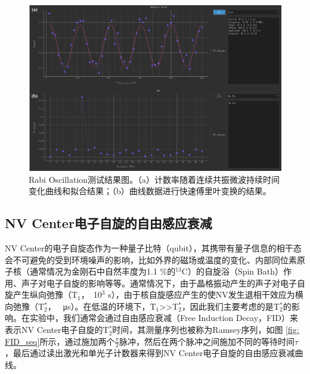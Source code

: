 \documentclass[type = bachelor, oneside]{whu-thesis}
\begin{document}
\begin{figure}
  \centering
  \includegraphics[width=1.0\textwidth]{figures/Chapter 2/Rabi Result.png}
  \caption[Rabi Oscillation测试结果图]{Rabi Oscillation测试结果图。（a）计数率随着连续共振微波持续时间变化曲线和拟合结果；（b）曲线数据进行快速傅里叶变换的结果。}
  \label{fig: Rabi Result}
\end{figure}

\subsection{NV Center电子自旋的自由感应衰减}

NV Center的电子自旋态作为一种量子比特（qubit），其携带有量子信息的相干态会不可避免的受到环境噪声的影响，比如外界的磁场或温度的变化、内部同位素原子核（通常情况为金刚石中自然丰度为1.1 \%的$^{13}$C）的自旋浴（Spin Bath）作用、声子对电子自旋的影响等等。通常情况下，由于晶格振动产生的声子对电子自旋产生纵向弛豫（T$_1$，~10$^3$ s），由于核自旋感应产生的使NV发生退相干效应为横向弛豫（T$_{2}^{*}$，~ μs）。在低温的环境下，T$_1$>>T$_{2}^{*}$，因此我们主要考虑的是T$_{2}^{*}$的影响。在实验中，我们通常会通过自由感应衰减（Free Induction Decay，FID）来表示NV Center电子自旋的T$_{2}^{*}$时间，其测量序列也被称为Ramsey序列，如图 \ref{fig: FID_seq}所示，通过施加两个$\frac{\pi}{2}$脉冲，然后在两个脉冲之间施加不同的等待时间$\tau$，最后通过读出激光和单光子计数器来得到NV Center电子自旋的自由感应衰减曲线。
\end{document}
